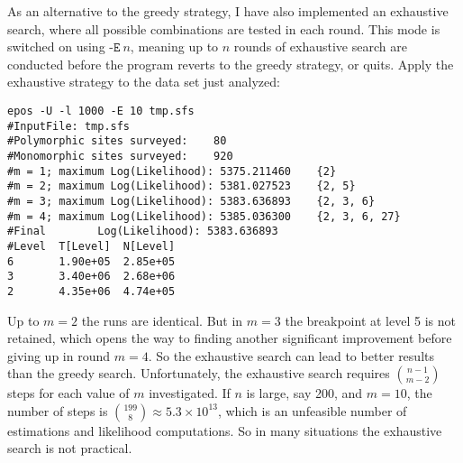 \documentclass[a4paper, english]{article}
\newcommand{\ty}{\texttt}
\begin{document}
\begin{itemize}
As an alternative to the greedy strategy, I have also implemented an
exhaustive search, where all possible combinations are tested in each
round. This mode is switched on using $\ty{-E}\ n$, meaning up to $n$
rounds of exhaustive search are conducted before the program reverts
to the greedy strategy, or quits. Apply the exhaustive strategy to the
data set just analyzed:
\begin{verbatim}
epos -U -l 1000 -E 10 tmp.sfs
#InputFile:	tmp.sfs
#Polymorphic sites surveyed:	80
#Monomorphic sites surveyed:	920
#m = 1; maximum Log(Likelihood): 5375.211460	{2}
#m = 2; maximum Log(Likelihood): 5381.027523	{2, 5}
#m = 3; maximum Log(Likelihood): 5383.636893	{2, 3, 6}
#m = 4; maximum Log(Likelihood): 5385.036300	{2, 3, 6, 27}
#Final        Log(Likelihood): 5383.636893
#Level  T[Level]  N[Level]
6       1.90e+05  2.85e+05
3       3.40e+06  2.68e+06
2       4.35e+06  4.74e+05
\end{verbatim}
Up to $m=2$ the runs are identical. But in $m=3$ the breakpoint at
level 5 is not retained, which opens the way to finding another
significant improvement before giving up in round $m=4$. So the
exhaustive search can lead to better results than the greedy
search. Unfortunately, the exhaustive search requires ${n-1\choose
  m-2}$ steps for each value of $m$ investigated. If $n$ is large, say
200, and $m=10$, the number of steps is ${199\choose 8}\approx
5.3\times10^{13}$, which is an unfeasible number of estimations and
likelihood computations. So in many situations the exhaustive search
is not practical.


\end{itemize}
\end{document}
